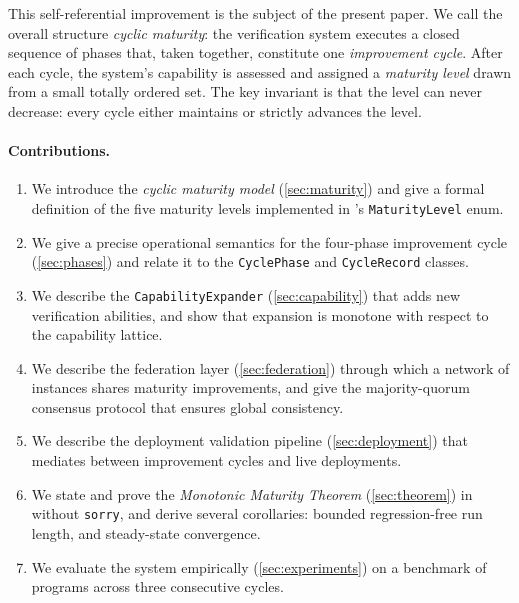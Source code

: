\documentclass[11pt]{article}
\begin{document}
This self-referential improvement is the subject of the present paper.  We
call the overall structure \emph{cyclic maturity}: the verification system
executes a closed sequence of phases that, taken together, constitute one
\emph{improvement cycle}.  After each cycle, the system's capability is
assessed and assigned a \emph{maturity level} drawn from a small totally
ordered set.  The key invariant is that the level can never decrease: every
cycle either maintains or strictly advances the level.

\paragraph{Contributions.}
\begin{enumerate}
  \item We introduce the \emph{cyclic maturity model} (\cref{sec:maturity})
    and give a formal definition of the five maturity levels implemented in
    \JuGeo{}'s \texttt{MaturityLevel} enum.

  \item We give a precise operational semantics for the four-phase improvement
    cycle (\cref{sec:phases}) and relate it to the \texttt{CyclePhase} and
    \texttt{CycleRecord} classes.

  \item We describe the \texttt{CapabilityExpander} (\cref{sec:capability})
    that adds new verification abilities, and show that expansion is monotone
    with respect to the capability lattice.

  \item We describe the federation layer (\cref{sec:federation}) through which
    a network of \JuGeo{} instances shares maturity improvements, and give the
    majority-quorum consensus protocol that ensures global consistency.

  \item We describe the deployment validation pipeline (\cref{sec:deployment})
    that mediates between improvement cycles and live deployments.

  \item We state and prove the \emph{Monotonic Maturity Theorem}
    (\cref{sec:theorem}) in \LEAN{} without \texttt{sorry}, and derive several
    corollaries: bounded regression-free run length, and steady-state
    convergence.

  \item We evaluate the system empirically (\cref{sec:experiments}) on a
    benchmark of \numcases{} programs across three consecutive cycles.
\end{enumerate}
\end{document}
